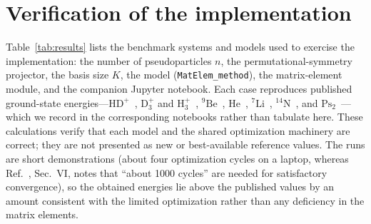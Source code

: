 \documentclass[11pt]{article}
\begin{document}
\section{Verification of the implementation}
\label{sec:results}

Table~\ref{tab:results} lists the benchmark systems and models used to exercise
the implementation: the number of pseudoparticles $n$, the permutational-symmetry
projector, the basis size $K$, the model (\texttt{MatElem\_method}), the
matrix-element module, and the companion Jupyter notebook. Each case reproduces
published ground-state energies---$\mathrm{HD^+}$~\cite{ATOMMOLnonBO},
$\mathrm{D_3^+}$ and $\mathrm{H_3^+}$~\cite{Pavanello2009,Lang2024},
$^9\mathrm{Be}$~\cite{Hornyak2019}, $\mathrm{He}$~\cite{HeliumAtom},
$^7\mathrm{Li}$~\cite{Bralin2019}, $^{14}\mathrm{N}$~\cite{Sharkey2014,Seth2011},
and $\mathrm{Ps_2}$~\cite{Bubin2008}---which we record in the corresponding
notebooks rather than tabulate here. These calculations verify that each model
and the shared optimization machinery are correct; they are not presented as new
or best-available reference values. The runs are short demonstrations (about four
optimization cycles on a laptop, whereas Ref.~\cite{Sharkey2014}, Sec.~VI, notes
that ``about 1000 cycles'' are needed for satisfactory convergence), so the
obtained energies lie above the published values by an amount consistent with the
limited optimization rather than any deficiency in the matrix elements.
\end{document}
